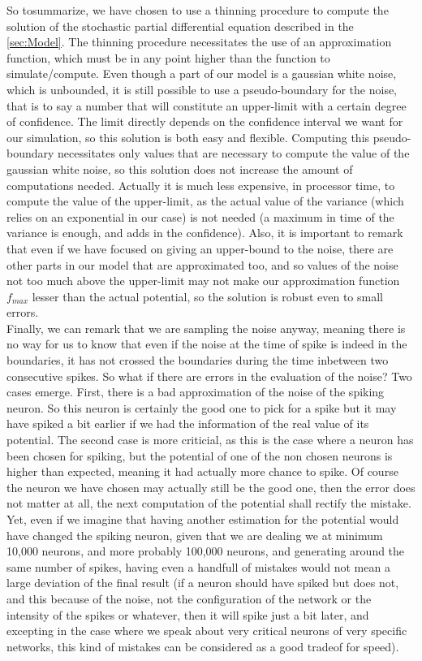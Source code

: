 	So tosummarize, we have chosen to use a thinning procedure to compute the solution of the stochastic partial differential equation described in the \ref{sec:Model}. The thinning procedure necessitates the use of an approximation function, which must be in any point higher than the function to simulate/compute. Even though a part of our model is a gaussian white noise, which is unbounded, it is still possible to use a pseudo-boundary for the noise, that is to say a number that will constitute an upper-limit with a certain degree of confidence. The limit directly depends on the confidence interval we want for our simulation, so this solution is both easy and flexible. Computing this pseudo-boundary necessitates only values that are necessary to compute the value of the gaussian white noise, so this solution does not increase the amount of computations needed. Actually it is much less expensive, in processor time, to compute the value of the upper-limit, as the actual value of the variance (which relies on an exponential in our case) is not needed (a maximum in time of the variance is enough, and adds in the confidence). Also, it is important to remark that even if we have focused on giving an upper-bound to the noise, there are other parts in our model that are approximated too, and so values of the noise not too much above the upper-limit may not make our approximation function $f_{max}$ lesser than the actual potential, so the solution is robust even to small errors.\\

	Finally, we can remark that we are sampling the noise anyway, meaning there is no way for us to know that even if the noise at the time of spike is indeed in the boundaries, it has not crossed the boundaries during the time inbetween two consecutive spikes. So what if there are errors in the evaluation of the noise? Two cases emerge. First, there is a bad approximation of the noise of the spiking neuron. So this neuron is certainly the good one to pick for a spike but it may have spiked a bit earlier if we had the information of the real value of its potential. The second case is more criticial, as this is the case where a neuron has been chosen for spiking, but the potential of one of the non chosen neurons is higher than expected, meaning it had actually more chance to spike. Of course the neuron we have chosen may actually still be the good one, then the error does not matter at all, the next computation of the potential shall rectify the mistake. Yet, even if we imagine that having another estimation for the potential would have changed the spiking neuron, given that we are dealing we at minimum 10,000 neurons, and more probably 100,000 neurons, and generating around the same number of spikes, having even a handfull of mistakes would not mean a large deviation of the final result (if a neuron should have spiked but does not, and this because of the noise, not the configuration of the network or the intensity of the spikes or whatever, then it will spike just a bit later, and excepting in the case where we speak about very critical neurons of very specific networks, this kind of mistakes can be considered as a good tradeof for speed).\\

